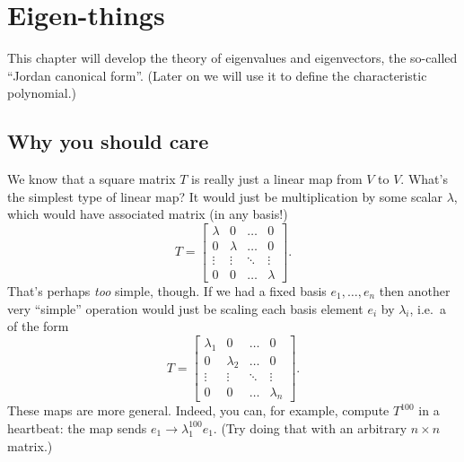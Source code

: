 \chapter{Eigen-things}
This chapter will develop the theory of eigenvalues and eigenvectors,
the so-called ``Jordan canonical form''.
(Later on we will use it to
define the characteristic polynomial.)

\section{Why you should care}
We know that a square matrix $T$ is really just
a linear map from $V$ to $V$.
What's the simplest type of linear map?
It would just be multiplication by some scalar $\lambda$,
which would have associated matrix (in any basis!)
\[
	T =
	\begin{bmatrix}
		\lambda & 0 & \dots & 0 \\
		0 & \lambda & \dots & 0 \\
		\vdots & \vdots & \ddots & \vdots \\
		0 & 0 & \dots & \lambda
	\end{bmatrix}.
\]
That's perhaps \emph{too} simple, though.
If we had a fixed basis $e_1, \dots, e_n$
then another very ``simple'' operation
would just be scaling each basis element $e_i$ by $\lambda_i$,
i.e.\ a  of the form
\[
	T = \begin{bmatrix}
		\lambda_1 & 0 & \dots & 0 \\
		0 & \lambda_2 & \dots & 0 \\
		\vdots & \vdots & \ddots & \vdots \\
		0 & 0 & \dots & \lambda_n
	\end{bmatrix}.
\]
These maps are more general.
Indeed, you can, for example, compute $T^{100}$ in a heartbeat:
the map sends $e_1 \to \lambda_1^{100} e_1$.
(Try doing that with an arbitrary $n \times n$ matrix.)

